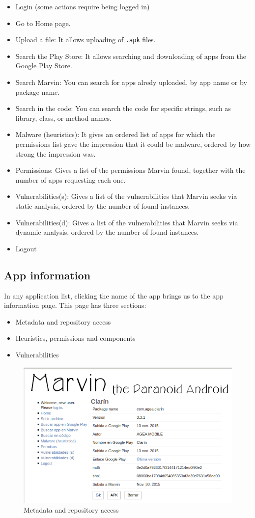 \documentclass[11pt]{article}
\begin{document}
\begin{itemize}
\item Login (some actions require being logged in)
\item Go to Home page.
\item Upload a file: It allows uploading of \texttt{.apk} files.
\item Search the Play Store: It allows searching and downloading of apps from the Google Play Store.
\item Search Marvin: You can search for apps alredy uploaded, by app name or by package name.
\item Search in the code: You can search the code for specific strings, such as library, class, or method names.
\item Malware (heuristics): It gives an ordered list of apps for which the permissions list gave the impression that it could be malware, ordered by how strong the impression was.
\item Permissions: Gives a list of the permissions Marvin found, together with the number of apps requesting each one.
\item Vulnerabilities(s): Gives a list of the vulnerabilities that Marvin seeks via static analysis, ordered by the number of found instances.
\item Vulnerabilities(d): Gives a list of the vulnerabilities that Marvin seeks via dynamic analysis, ordered by the number of found instances.
\item Logout 
\end{itemize}

\subsection{App information}\label{appinfo}
In any application list, clicking the name of the app brings us to the app information page. This page has three sections:
\begin{itemize}
\item Metadata and repository access
\item Heuristics, permissions and components
\item Vulnerabilities
\end{itemize}
\begin{figure}[H]
\begin{center}
\includegraphics[width=.8\textwidth]{graphics/marvin_app1.png}
\caption{Metadata and repository access}
\end{center}
\end{figure}
\end{document}
